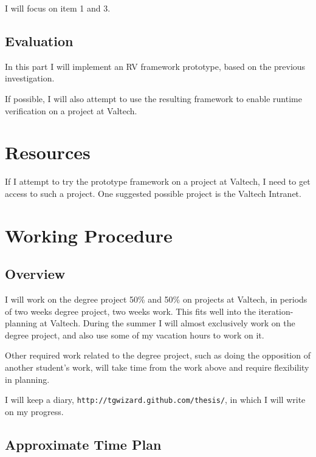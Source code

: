 \documentclass[a4paper,11pt]{article}
\begin{document}
I will focus on item 1 and 3.


\subsection{Evaluation}

In this part I will implement an RV framework prototype, based on the previous
investigation.

If possible, I will also attempt to use the resulting framework to enable runtime verification on a project at Valtech.


\section{Resources}

If I attempt to try the prototype framework on a project at Valtech, I need to get access to such a project. One suggested possible project is the Valtech Intranet.


\section{Working Procedure}

\subsection{Overview}

I will work on the degree project 50\% and 50\% on projects at Valtech, in periods of
two weeks degree project, two weeks work. This fits well into the iteration-planning at
Valtech. During the summer I will almost exclusively work on the degree project, and also
use some of my vacation hours to work on it.

Other required work related to the degree project, such as doing the opposition of
another student's work, will take time from the work above and require
flexibility in planning.

I will keep a diary, \texttt{http://tgwizard.github.com/thesis/}, in which I will write on my progress. 

\subsection{Approximate Time Plan}
\end{document}
